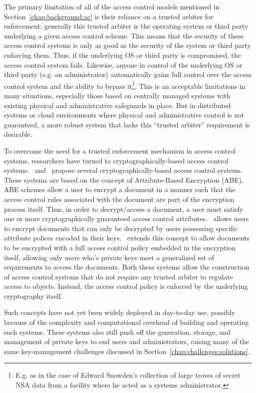 The primary limitation of all of the access control models mentioned
in Section~\ref{chap:background:ac} is their reliance on a trusted
arbiter for enforcement: generally this trusted arbiter is the
operating system or third party underlying a given access control
scheme. This means that the security of these access control systems
is only as good as the security of the system or third party enforcing
them. Thus, if the underlying OS or third party is compromised, the
access control system fails. Likewise, anyone in control of the
underlying OS or third party (e.g. an administrator) automatically
gains full control over the access control system and the ability to
bypass it\footnote{E.g. as in the case of Edward Snowden's collection
  of large troves of secret NSA data from a facility where he acted as
  a systems administrator.}. This is an acceptable limitations in many
situations, especially those based on centrally managed systems with
existing physical and administrative safeguards in place. But in
distributed systems or cloud environments where physical and
administrative control is not guaranteed, a more robust system that
lacks this ``trusted arbiter'' requirement is desirable.

To overcome the need for a trusted enforcement mechanism in access
control systems, researchers have turned to cryptographically-based
access control systems. \cite{goyal2006}~and~\cite{bethencourt2007}
propose several cryptographically-based access control systems. These
systems are based on the concept of Attribute-Based Encryption
(ABE). ABE schemes allow a user to encrypt a document in a manner such
that the access control rules associated with the document are part of
the encryption process itself. Thus, in order to decrypt/access a
document, a user must satisfy one or more cryptographically guaranteed
access control attributes. \cite{goyal2006}~allows users to encrypt
documents that can only be decrypted by users possessing specific
attribute polices encoded in their keys.
\cite{bethencourt2007}~extends this concept to allow documents to be
encrypted with a full access control policy embedded in the encryption
itself, allowing only users who's private keys meet a generalized set
of requirements to access the documents. Both these systems allow the
construction of access control systems that do not require any trusted
arbiter to regulate access to objects. Instead, the access control
policy is enforced by the underlying cryptography itself.

Such concepts have not yet been widely deployed in day-to-day use,
possibly because of the complexity and computational overhead of
building and operating such systems. These systems also still push off
the generation, storage, and management of private keys to end users
and administrators, raising many of the same key-management challenges
discussed in Section~\ref{chap:challenges:solutions}.

